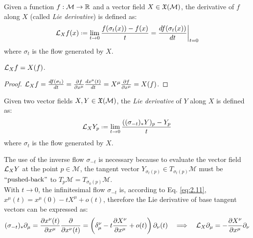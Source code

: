 \begin{definition}
  Given a function $ f : \mathcal{M} \rightarrow \mathbb{R} $ and a vector field $ X \in\mathfrak{X}(\mathcal{M}) $, the derivative of $ f $ along $ X $ (called \textit{Lie derivative}) is defined as:
  \begin{equation}
    \ld_X f(x) \defeq \lim_{t \rightarrow 0} \frac{f(\sigma_t(x)) - f(x)}{t} = \frac{df(\sigma_t(x))}{dt}\bigg\vert_{t=0}
    \label{eq:2.14}
  \end{equation}
  where $ \sigma_t $ is the flow generated by $ X $.
\end{definition}

\begin{proposition}
  $ \mathcal{L}_X f = X(f) $.
\end{proposition}
\begin{proof}
  $ \mathcal{L}_X f = \frac{df(\sigma_t)}{dt} = \frac{\partial f}{\partial x^{\mu}} \frac{dx^{\mu}(t)}{dt} = X^{\mu} \frac{\partial f}{\partial x^{\mu}} = X(f) $.
\end{proof}

\begin{definition}
  Given two vector fields $ X,Y \in\mathfrak{X}(\mathcal{M}) $, the \textit{Lie derivative} of $ Y $ along $ X $ is defined as:
  \begin{equation}
    \ld_X Y_p \defeq \lim_{t \rightarrow 0} \frac{((\sigma_{-t})_*Y)_p - Y_p}{t}
    \label{eq:2.15}
  \end{equation}
  where $ \sigma_t $ is the flow generated by $ X $.
\end{definition}

The use of the inverse flow $ \sigma_{-t} $ is necessary because to evaluate the vector field $ \mathcal{L}_X Y $ at the point $ p \in \mathcal{M} $, the tangent vector $ Y_{\sigma_t(p)} \in T_{\sigma_t(p)}\mathcal{M} $ must be $ ``\text{pushed-back}" $ to $ T_p\mathcal{M} = T_{\sigma_0(p)}\mathcal{M} $.\\
With $ t \rightarrow 0 $, the infinitesimal flow $ \sigma_{-t} $ is, according to Eq. \ref{eq:2.11}, $ x^{\mu}(t) = x^{\mu}(0) - tX^{\mu} + o(t) $, therefore the Lie derivative of base tangent vectors can be expressed as:
\begin{equation}
  (\sigma_{-t})_* \partial_{\mu} = \frac{\partial x^{\nu}(t)}{\partial x^{\mu}} \frac{\partial}{\partial x^{\nu}(t)} = \left( \delta^{\nu}_{\mu} - t \frac{\partial X^{\nu}}{\partial x^{\mu}} + o(t) \right) \partial_{\nu}(t)
  \quad\Longrightarrow\quad
  \mathcal{L}_X \partial_{\mu} = - \frac{\partial X^{\nu}}{\partial x^{\mu}} \partial_{\nu}
  \label{eq:2.16}
\end{equation}

